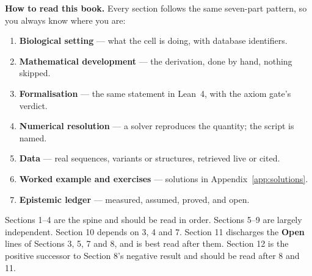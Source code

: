 \documentclass[11pt,a4paper]{article}
\theoremstyle{plain}
\theoremstyle{definition}
\theoremstyle{remark}
\begin{document}
\begin{abstract}
Section~12 is new in this edition and does the harder thing: it replaces
Section~8's failed test rather than only reporting that it failed. Moving from
one sequence to a \emph{population} makes the null a theorem --- a strict
molecular clock on a clonal genealogy admits no unfilled cycle --- so a
violation becomes a certificate the Lean kernel can check rather than a
$p$-value against shuffles. The section then refutes its own first statistic: a
clonal population with a relaxed clock and no recombination whatever violates
the clock-level condition \emph{more} strongly than a real recombinant does, so
the tree-level four-point condition must carry the method, and a proof that the
two conditions nest is what licenses reading the difference between them. It
closes on ten real viral populations, seven of which are reported blocked
because a measured control shows the aligner alone would have produced the
answer --- and, in this edition, on the comparison against the established test
that shares its no-clock null, which the two pass identically wherever both can
be measured. The method's case is therefore made for its discipline and its
exhibitable witness rather than for its power.
\end{abstract}

\vspace{0.5em}
\begin{objectives}
\textbf{How to read this book.} Every section follows the same seven-part
pattern, so you always know where you are:
\begin{enumerate}[leftmargin=*,itemsep=1pt,topsep=2pt]
  \item \textbf{Biological setting} --- what the cell is doing, with database identifiers.
  \item \textbf{Mathematical development} --- the derivation, done by hand, nothing skipped.
  \item \textbf{Formalisation} --- the same statement in Lean~4, with the axiom gate's verdict.
  \item \textbf{Numerical resolution} --- a solver reproduces the quantity; the script is named.
  \item \textbf{Data} --- real sequences, variants or structures, retrieved live or cited.
  \item \textbf{Worked example and exercises} --- solutions in Appendix~\ref{app:solutions}.
  \item \textbf{Epistemic ledger} --- measured, assumed, proved, and open.
\end{enumerate}
Sections 1--4 are the spine and should be read in order. Sections 5--9 are
largely independent. Section 10 depends on 3, 4 and 7. Section 11 discharges
the \textbf{Open} lines of Sections 3, 5, 7 and 8, and is best read after them.
Section 12 is the positive successor to Section 8's negative result and should
be read after 8 and 11.
\end{objectives}
\end{document}
